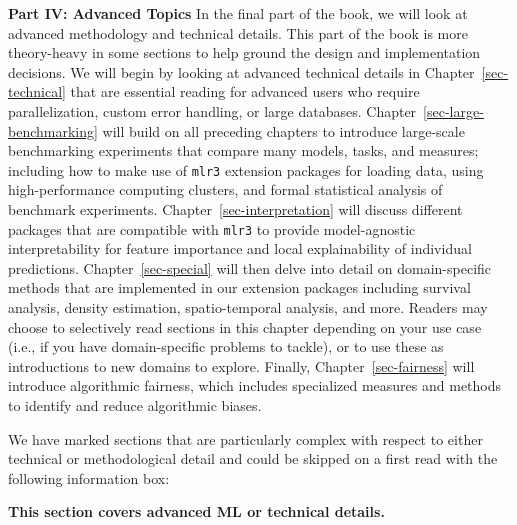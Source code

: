 \textbf{Part IV: Advanced Topics} In the final part of the book, we will
look at advanced methodology and technical details. This part of the
book is more theory-heavy in some sections to help ground the design and
implementation decisions. We will begin by looking at advanced technical
details in Chapter~\ref{sec-technical} that are essential reading for
advanced users who require parallelization, custom error handling, or
large databases. Chapter~\ref{sec-large-benchmarking} will build on all
preceding chapters to introduce large-scale benchmarking experiments
that compare many models, tasks, and measures; including how to make use
of \texttt{mlr3} extension packages for loading data, using
high-performance computing clusters, and formal statistical analysis of
benchmark experiments. Chapter~\ref{sec-interpretation} will discuss
different packages that are compatible with \texttt{mlr3} to provide
model-agnostic interpretability for feature importance and local
explainability of individual predictions. Chapter~\ref{sec-special} will
then delve into detail on domain-specific methods that are implemented
in our extension packages including survival analysis, density
estimation, spatio-temporal analysis, and more. Readers may choose to
selectively read sections in this chapter depending on your use case
(i.e., if you have domain-specific problems to tackle), or to use these
as introductions to new domains to explore. Finally,
Chapter~\ref{sec-fairness} will introduce algorithmic fairness, which
includes specialized measures and methods to identify and reduce
algorithmic biases.

We have marked sections that are particularly complex with respect to
either technical or methodological detail and could be skipped on a
first read with the following information box:

\begin{tcolorbox}[enhanced jigsaw, colframe=quarto-callout-note-color-frame, rightrule=.15mm, bottomrule=.15mm, toprule=.15mm, opacityback=0, colback=white, left=2mm, arc=.35mm, breakable, leftrule=.75mm]
\begin{minipage}[t]{5.5mm}
\textcolor{quarto-callout-note-color}{\faInfo}
\end{minipage}%
\begin{minipage}[t]{\textwidth - 5.5mm}

\textbf{This section covers advanced ML or technical
details.}\vspace{2mm}

\end{minipage}%
\end{tcolorbox}

